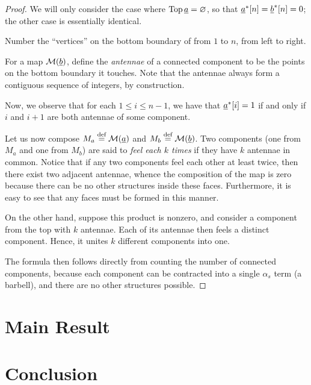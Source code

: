\begin{proof}
	We will only consider the case where $\operatorname{Top} \underline{a} = \varnothing$, so that $\underline{a}^\ast[n] = \underline{b}^\ast[n] = 0$; the other case is essentially identical.

	Number the ``vertices'' on the bottom boundary of from $1$ to $n$, from left to right.  

	For a map $\mathcal M(\underline{b})$, define the \emph{antennae} of a connected component to be the points on the bottom boundary it touches.  Note that the antennae always form a contiguous sequence of integers, by construction.

	Now, we observe that for each $1 \le i \le n-1$, we have that $\underline{a}^\ast[i] = 1$ if and only if $i$ and $i+1$ are both antennae of some component.

	Let us now compose $M_a \stackrel{\text{def}}{=} \mathcal M(\underline{a})$ and $M_b \stackrel{\text{def}}{=} \mathcal M(\underline{b})$.  Two components (one from $M_a$ and one from $M_b$) are said to \emph{feel each $k$ times} if they have $k$ antennae in common.  Notice that if any two components feel each other at least twice, then there exist two adjacent antennae, whence the composition of the map is zero because there can be no other structures inside these faces.  Furthermore, it is easy to see that any faces must be formed in this manner.

	On the other hand, suppose this product is nonzero, and consider a component from the top with $k$ antennae.  Each of its antennae then feels a distinct component.  Hence, it unites $k$ different components into one.

	The formula then follows directly from counting the number of connected components, because each component can be contracted into a single $\alpha_s$ term (a barbell), and there are no other structures possible.
\end{proof}



\section{Main Result}
\label{sec:mainresult}

\section{Conclusion}


